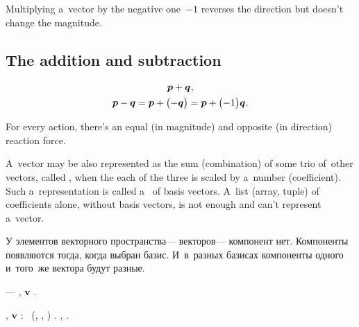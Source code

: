 Multiplying a~vector by the negative one~${ -1}$ reverses the direction but doesn’t change the magnitude.

\subsection{The addition and subtraction}

\nopagebreak\vspace{-0.1em}\begin{gather*}
\bm{p} + \bm{q}
\hspace{.1ex} ,
\\
\bm{p} - \bm{q} = \bm{p} + \bigl( - \bm{q} \bigr)
= \bm{p} + \bigl( - 1 \bigr) \bm{q}
\hspace{.1ex} .
\end{gather*}

For every action, there’s an equal (in magnitude) and opposite (in direction) reaction force.

A~vector may be also represented as the sum (combination) of some trio of~other vectors, called , when the each of the three is scaled by a~number (coefficient).
Such a~representation is called a~ of basis vectors.
A~list (array, tuple) of coefficients alone, without basis vectors, is not enough and can’t represent a~vector.

{\small
\foreignlanguage{russian}{У элементов векторного пространства\:--- векторов\:--- компонент нет.
Компоненты появляются тогда, когда выбран базис.
И~в~разных базисах компоненты одного и~того~же вектора будут разные.}
\par}

\:--- , $\bm{v}$   .

, $\bm{v}$  : ~(, , )  .
,    .

